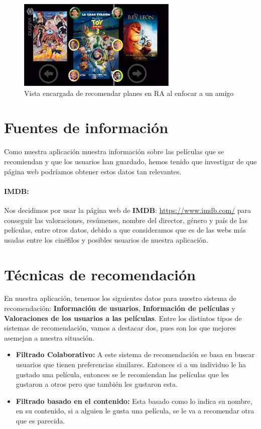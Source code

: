 \begin{flushleft}
    \begin{figure}[H]
        \centering
        \includegraphics[width=3in, angle=270]{figures/chapter-2/recomendadorAR.JPG}
        \caption{Vista encargada de recomendar planes en RA al enfocar a un amigo}
    \end{figure}
    
\end{flushleft}
\newpage
\section{Fuentes de información}
\label{makereference2.3}
Como nuestra aplicación muestra información sobre las películas que se recomiendan y que los usuarios han guardado, hemos
tenido que investigar de que página web podríamos obtener estos datos tan relevantes.
\paragraph{IMDB:}
Nos decidimos por usar la página web de \textbf{IMDB}: \url{https://www.imdb.com/} para conseguir las valoraciones, resúmenes, nombre del director,
género y país de las películas, entre otros datos, debido a que consideramos que es de las webs más usadas entre los cinéfilos y posibles 
usuarios de nuestra aplicación.

\section{Técnicas de recomendación}
\label{makereference2.4}
En nuestra aplicación, tenemos los siguientes datos para nuestro sistema de recomendación: \textbf{Información de usuarios}, \textbf{Información de películas} y \textbf{Valoraciones de los usuarios a las películas}.
Entre los distintos tipos de sistemas de recomendación, vamos a destacar dos, pues son los que mejores asemejan a nuestra situación.

\begin{itemize}
    \item \textbf{Filtrado Colaborativo:} A este sistema de recomendación se basa en buscar usuarios que tienen preferencias similares. Entonces si a un individuo le ha gustado una película, entonces se le recomiendan las películas que les gustaron a otros pero que también les gustaron esta.
    \item \textbf{Filtrado basado en el contenido:} Esta basado como lo indica su nombre, en su contenido, si a alguien le gusta una película, se le va a recomendar otra que es parecida.
\end{itemize} 

